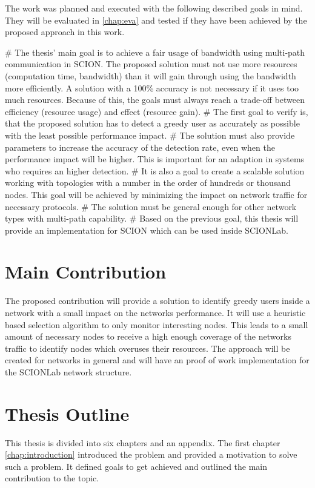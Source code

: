 \documentclass[thesis.tex]{subfiles}
\begin{document}
The work was planned and executed with the following described goals in mind. They will be evaluated in \autoref{chap:eva} and tested if they have been achieved by the proposed approach in this work.
     \begin{easylist}
        \MyNumberedListProperties
        # The thesis' main goal is to achieve a fair usage of bandwidth using multi-path communication in SCION. The proposed solution must not use more resources (computation time, bandwidth) than it will gain through using the bandwidth more efficiently. A solution with a 100\% accuracy is not necessary if it uses too much resources. Because of this, the goals must always reach a trade-off between efficiency (resource usage) and effect (resource gain).        
        # The first goal to verify is, that the proposed solution has to detect a greedy user as accurately as possible with the least possible performance impact.
        # The solution must also provide parameters to increase the accuracy of the detection rate, even when the performance impact will be higher. This is important for an adaption in systems who requires an higher detection.
        # It is also a goal to create a scalable solution working with topologies with a number in the order of hundreds or thousand nodes. This goal will be achieved by minimizing the impact on network traffic for necessary protocols.
        # The solution must be general enough for other network types with multi-path capability.        
        # Based on the previous goal, this thesis will provide an implementation for SCION which can be used inside SCIONLab.
    \end{easylist}

\section{Main Contribution}
The proposed contribution will provide a solution to identify greedy users inside a network with a small impact on the networks performance. It will use a heuristic based selection algorithm to only monitor interesting nodes. This leads to a small amount of necessary nodes to receive a high enough coverage of the networks traffic to identify nodes which overuses their resources. The approach will be created for networks in general and will have an proof of work implementation for the SCIONLab network structure.

\section{Thesis Outline}
This thesis is divided into six chapters and an appendix. The first chapter \autoref{chap:introduction} introduced the problem and provided a motivation to solve such a problem. It defined goals to get achieved and outlined the main contribution to the topic.
\end{document}
